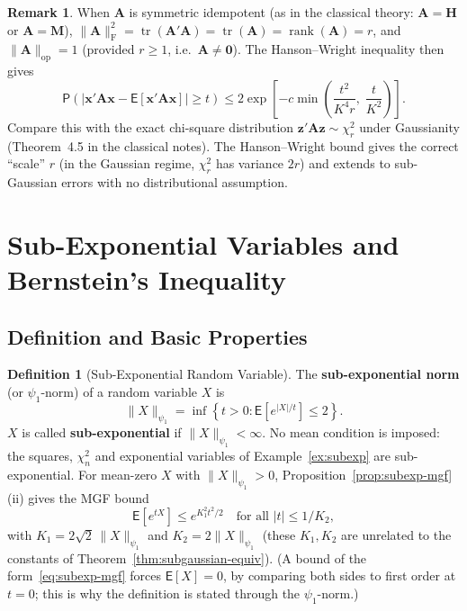 \documentclass[12pt,a4paper]{article}
\theoremstyle{definition}
\newtheorem{definition}[theorem]{Definition}
\newtheorem{remark}[theorem]{Remark}
\newcommand\expc{\mathsf{E}}
\newcommand\prb{\mathsf{P}}
\DeclareMathOperator\tr{tr}
\DeclareMathOperator\rank{rank}
\newcommand{\bx}{\mathbf{x}}
\newcommand{\bH}{\mathbf{H}}
\newcommand{\bM}{\mathbf{M}}
\newcommand{\bzero}{\mathbf{0}}
\newcommand{\bz}{\mathbf{z}}
\newcommand{\bA}{\mathbf{A}}
\newcommand{\opnorm}[1]{\|#1\|_{\mathrm{op}}}
\newcommand{\fnorm}[1]{\|#1\|_{\mathrm{F}}}
\begin{document}
\begin{remark}
When $\bA$ is symmetric idempotent (as in the classical theory: $\bA = \bH$ or $\bA = \bM$), $\fnorm{\bA}^2 = \tr(\bA'\bA) = \tr(\bA) = \rank(\bA) = r$, and $\opnorm{\bA} = 1$ (provided $r \geqslant 1$, i.e.\ $\bA \neq \bzero$). The Hanson--Wright inequality then gives
\[
\prb\!\left(|\bx'\bA\bx - \expc[\bx'\bA\bx]| \geqslant t\right) \leqslant 2\exp\!\left[-c\min\!\left(\frac{t^2}{K^4 r},\; \frac{t}{K^2}\right)\right].
\]
Compare this with the exact chi-square distribution $\bz'\bA\bz \sim \chi^2_r$ under Gaussianity (Theorem~4.5 in the classical notes). The Hanson--Wright bound gives the correct ``scale'' $r$ (in the Gaussian regime, $\chi^2_r$ has variance $2r$) and extends to sub-Gaussian errors with no distributional assumption.
\end{remark}

\section{Sub-Exponential Variables and Bernstein's Inequality}\label{sec:subexp}

\subsection{Definition and Basic Properties}

\begin{definition}[Sub-Exponential Random Variable]\label{def:subexponential}
The \textbf{sub-exponential norm} (or $\psi_1$-norm) of a random variable $X$ is
\begin{equation}\label{eq:psi1}
\|X\|_{\psi_1} = \inf\!\left\{t > 0 : \expc\!\left[e^{|X|/t}\right] \leqslant 2\right\}.
\end{equation}
$X$ is called \textbf{sub-exponential} if $\|X\|_{\psi_1} < \infty$. No mean condition is imposed: the squares, $\chi^2_n$ and exponential variables of Example~\ref{ex:subexp} are sub-exponential. For mean-zero $X$ with $\|X\|_{\psi_1} > 0$, Proposition~\ref{prop:subexp-mgf}(ii) gives the MGF bound
\begin{equation}\label{eq:subexp-mgf}
\expc[e^{tX}] \leqslant e^{K_1^2 t^2/2} \quad \text{for all } |t| \leqslant 1/K_2,
\end{equation}
with $K_1 = 2\sqrt{2}\,\|X\|_{\psi_1}$ and $K_2 = 2\|X\|_{\psi_1}$ (these $K_1, K_2$ are unrelated to the constants of Theorem~\ref{thm:subgaussian-equiv}). (A bound of the form~\eqref{eq:subexp-mgf} forces $\expc[X] = 0$, by comparing both sides to first order at $t = 0$; this is why the definition is stated through the $\psi_1$-norm.)
\end{definition}
\end{document}
